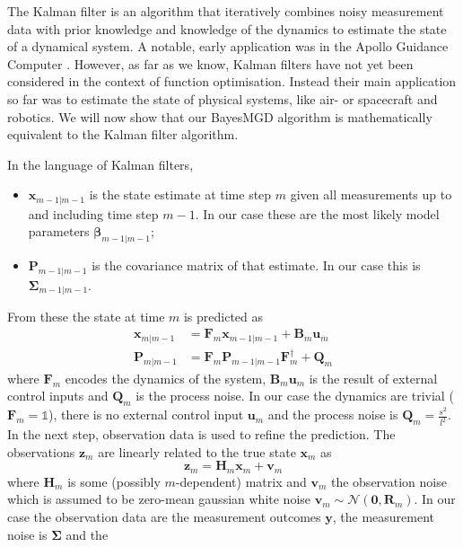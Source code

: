 \documentclass[aps,prb,twoside,superscriptaddress,longbibliography,nofootinbib,floatfix, notitlepage,twocolumn]{revtex4-1}
\renewcommand{\vec}[1]{\boldsymbol{#1}}
\begin{document}
{The Kalman filter is an algorithm that iteratively combines noisy measurement data
with prior knowledge and knowledge of the dynamics to estimate the state of a 
dynamical system\cite{kalman60}. A notable, early application
was in the Apollo Guidance Computer \cite{apolloguidance69}. 
However, as far as we know, Kalman filters have not yet been considered in the context of function 
optimisation. Instead their main application so far was to estimate the state of physical systems, like
air- or spacecraft and robotics.
We will now show that our BayesMGD algorithm is mathematically equivalent to the Kalman filter algorithm.

In the language of Kalman filters,
\begin{itemize}
    \item $\vec x_{m-1|m-1}$ is the state estimate at time step $m$ given all
    measurements up to and including time step $m-1$. In our case these are the 
    most likely model parameters $\vec\beta_{m-1|m-1}$;
    \item $\vec P_{m-1|m-1}$ is the covariance matrix of that estimate. In our case 
    this is $\vec\Sigma_{m-1|m-1}$.
\end{itemize}
From these the state at time $m$ is predicted as 
\begin{equation}
\begin{aligned}
    \vec x_{m|m-1} &= \vec F_m \vec x_{m-1|m-1} + \vec B_m \vec u_m \\
    \vec P_{m|m-1} &= \vec F_m \vec P_{m-1|m-1} \vec F_m^\dagger + \vec Q_m
\end{aligned}
\end{equation}
where $\vec{F}_m$ encodes the dynamics of the system, $\vec B_m \vec u_m$ is the 
result of external control inputs and $\vec Q_m$ is the process noise. In our 
case the dynamics are trivial ($\vec F_m = \mathds{1}$), there is no external 
control input $\vec u_m$ and the process noise is $\vec Q_m = \frac{s^2}{l^2}$.
In the next step, observation data is used to refine the prediction. The 
observations $\vec z_m$ are linearly related to the true state $\vec x_m$ as 
\begin{equation}
    \vec z_m = \vec H_m \vec x_m + \vec v_m
\end{equation}
where $\vec{H}_m$ is some (possibly $m$-dependent) matrix and $\vec v_m$ the observation noise which
is assumed to be zero-mean gaussian white noise $\vec v_m \sim \mathcal{N}(\vec 0, \vec R_m)$.
In our case the observation data are the 
measurement outcomes $\vec y$, the measurement noise is $\vec \Sigma$ and the
}
\end{document}
